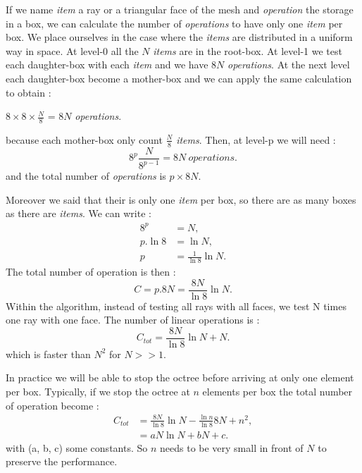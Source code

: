 \documentclass[AMA,STIX1COL]{WileyNJD-v2}
\begin{document}
If we name \textit{item} a ray or a triangular face of the mesh and \textit{operation} the storage in a box, we can calculate the number of \textit{operations} to have only one \textit{item} per box. We place ourselves in the case where the \textit{items} are distributed in a uniform way in space. At level-0 all the $N$ \textit{items} are in the root-box. At level-1 we test each daughter-box with each \textit{item} and we have $8N$ \textit{operations}. At the next level each daughter-box become a mother-box and we can apply the same calculation to obtain :
\begin{center}
$8\times 8\times \frac{N}{8}$ = $8N$ \textit{operations}.
\end{center}
because each mother-box only count $\frac{N}{8}$ \textit{items}. Then, at level-p we will need  :
%
\begin{equation} \label{operation}
8^p\frac{N}{8^{p-1}} = 8N \ \textit{operations}.
\end{equation}
%
and the total number of \textit{operations} is $p\times 8N$.

Moreover we said that their is only one \textit{item} per box, so there are as many boxes as there are \textit{items}. We can write :
%
\begin{align}  \label{nbEtage}
8^p &= N \nonumber, \\
p.\ln{8} &= \ln{N} \nonumber, \\
p &= \frac{1}{\ln{8}}\ln{N}.
\end{align}
%
The total number of operation is then :
\begin{equation}
C = p.8N = \frac{8N}{\ln8}\ln{N}.
\end{equation}
%
Within the algorithm, instead of testing all rays with all faces, we test N times one ray with one face. The number of linear operations is :
\begin{equation}
C_{tot} =  \frac{8N}{\ln8}\ln{N} + N.
\end{equation}
which is faster than $N^2$ for $N>>1$.

In practice we will be able to stop the octree before arriving at only one element per box. Typically, if we stop the octree at $n$ elements per box the total number of operation become :
\begin{align}
C_{tot} &= \frac{8N}{\ln8}\ln{N} - \frac{\ln n }{\ln8}8N + n^2, \\
 &= aN\ln{N} +bN + c. \nonumber
\end{align}
with (a, b, c) some constants. So $n$ needs to be very small in front of $N$ to preserve the performance.
\end{document}
